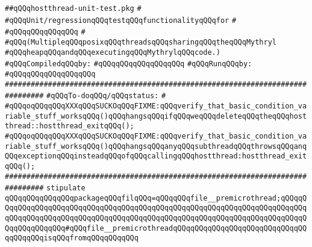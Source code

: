 \label{src/lib/std/src/hostthread-unit-test.pkg}
\verb|##qQQqhostthread-unit-test.pkg|\newline
\verb|#|\newline
\verb|#qQQqUnit/regressionqQQqtestqQQqfunctionalityqQQqfor|\newline
\verb|#|\newline
\verb|#qQQqqQQqqQQqqQQq|\newline
\verb|#|\newline
\verb|#qQQq(MultipleqQQqposixqQQqthreadsqQQqsharingqQQqtheqQQqMythryl|\newline
\verb|#qQQqheapqQQqandqQQqexecutingqQQqMythrylqQQqcode.)|\newline
\newline
\verb|#qQQqCompiledqQQqby:|\newline
\verb|#qQQqqQQqqQQqqQQqqQQq|\newline
\newline
\verb|#qQQqRunqQQqby:|\newline
\verb|#qQQqqQQqqQQqqQQqqQQq|\newline
\newline
\newline
\verb|###############################################################################|\newline
\verb|#qQQqTo-doqQQq/qQQqstatus:|\newline
\verb|#|\newline
\verb|#qQQqoqQQqqQQqXXXqQQqSUCKOqQQqFIXME:qQQqverify_that_basic_condition_variable_stuff_worksqQQq()qQQqhangsqQQqifqQQqweqQQqdeleteqQQqtheqQQqhostthread::hostthread_exitqQQq();|\newline
\verb|#qQQqoqQQqqQQqXXXqQQqSUCKOqQQqFIXME:qQQqverify_that_basic_condition_variable_stuff_worksqQQq()qQQqhangsqQQqanyqQQqsubthreadqQQqthrowsqQQqanqQQqexceptionqQQqinsteadqQQqofqQQqcallingqQQqhostthread:hostthread_exitqQQq();|\newline
\verb|###############################################################################|\newline
\newline
\verb|stipulate|\newline
\verb|qQQqqQQqqQQqqQQqpackageqQQqfilqQQq=qQQqqQQqfile__premicrothread;qQQqqQQqqQQqqQQqqQQqqQQqqQQqqQQqqQQqqQQqqQQqqQQqqQQqqQQqqQQqqQQqqQQqqQQqqQQqqQQqqQQqqQQqqQQqqQQqqQQqqQQqqQQqqQQqqQQqqQQqqQQqqQQqqQQqqQQqqQQqqQQqqQQqqQQqqQQqqQQq#qQQqfile__premicrothreadqQQqqQQqqQQqqQQqqQQqqQQqqQQqqQQqqQQqqQQqisqQQqfromqQQqqQQqqQQq|\newline
